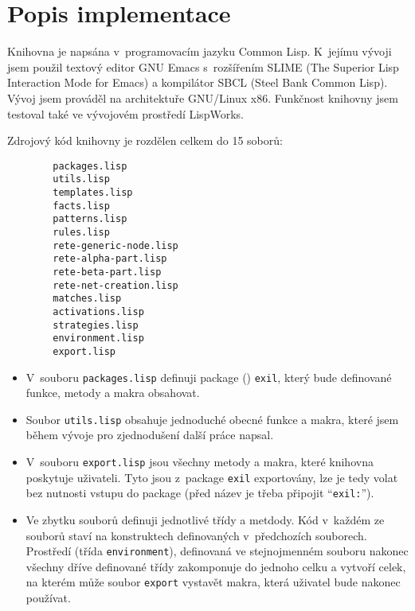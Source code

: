 \section{Popis implementace}
Knihovna je napsána v~programovacím jazyku Common Lisp. K~jejímu vývoji jsem
použil textový editor \textsf{GNU Emacs} s~rozšířením \textsf{SLIME} (The
Superior Lisp Interaction Mode for Emacs) a kompilátor \textsf{SBCL} (Steel Bank
Common Lisp). Vývoj jsem prováděl na architektuře \textsf{GNU/Linux x86}.
Funkčnost knihovny jsem testoval také ve vývojovém prostředí
LispWorks\textsuperscript{\textregistered}.

Zdrojový kód knihovny je rozdělen celkem do 15 soborů:
\begin{verbatim}
        packages.lisp
        utils.lisp
        templates.lisp
        facts.lisp
        patterns.lisp
        rules.lisp
        rete-generic-node.lisp
        rete-alpha-part.lisp
        rete-beta-part.lisp
        rete-net-creation.lisp
        matches.lisp
        activations.lisp
        strategies.lisp
        environment.lisp
        export.lisp
\end{verbatim}
\begin{itemize}
\item V~souboru \verb|packages.lisp| definuji package () \verb|exil|,
který bude definované funkce, metody a makra obsahovat.
\item Soubor \verb|utils.lisp| obsahuje jednoduché obecné funkce a makra, které
jsem během vývoje pro zjednodušení další práce napsal.
\item V~souboru \verb|export.lisp| jsou všechny metody a makra, které knihovna
poskytuje uživateli. Tyto jsou z~package \verb|exil| exportovány, lze je
tedy volat bez nutnosti vstupu do package (před název je třeba připojit
``\verb|exil:|'').
\item Ve zbytku souborů definuji jednotlivé třídy a metdody. Kód v~každém ze
souborů staví na konstruktech definovaných v~předchozích souborech. Prostředí
(třída \verb|environment|), definovaná ve stejnojmenném souboru nakonec všechny
dříve definované třídy zakomponuje do jednoho celku a vytvoří celek, na kterém
může soubor \verb|export| vystavět makra, která uživatel bude nakonec používat.
\end{itemize}
